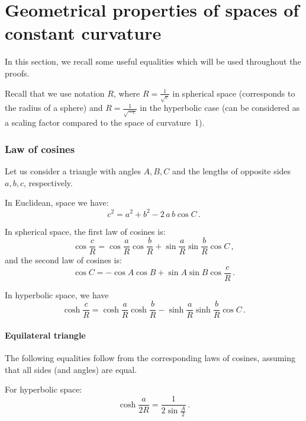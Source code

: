 \documentclass[runningheads]{llncs}
\begin{document}
%
%


%

\appendix

\section{Geometrical properties of spaces of constant curvature}\label{sec:properties}

In this section, we recall some useful equalities which will be used throughout the proofs.

Recall that we use notation $R$, where $R = \frac{1}{\sqrt{c}}$ in spherical space (corresponds to the radius of a sphere) and  $R = \frac{1}{\sqrt{-c}}$ in the hyperbolic case (can be considered as a scaling factor compared to the space of curvature~1).

\subsubsection{Law of cosines}

Let us consider a triangle with angles $A, B, C$ and the lengths of opposite sides $a, b, c$, respectively.

In Euclidean, space we have:
\[
c^2 = a^2 + b^2 - 2 \, a\, b \cos C\,.
\]

In spherical space, the first law of cosines is:
\[
\cos \frac{c}{R} =\cos \frac{a}{R} \cos \frac{b}{R} + \sin \frac{a}{R}\sin \frac{b}{R}\cos C \,,
\]
and the second law of cosines is:
\[
\cos C=-\cos A\cos B+\sin A\sin B\cos \frac{c}{R}\,.
\]

In hyperbolic space, we have 
\[
\cosh {\frac {c}{R}}= \cosh {\frac {a}{R}}\cosh {\frac {b}{R}}-\sinh {\frac {a}{R}}\sinh {\frac {b}{R}}\cos C \,.
\]

\paragraph{Equilateral triangle}

The following equalities follow from the corresponding laws of cosines, assuming that all sides (and angles) are equal.

For hyperbolic space:
\begin{equation}\label{eq:hyp_eq}
\cosh\frac{a}{2R} = \frac{1}{2\sin \frac{A}{2}}\,.
\end{equation}
\end{document}
